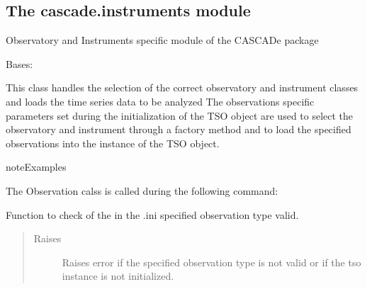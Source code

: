 \documentclass[a4paper,10pt,english]{sphinxmanual}
\begin{document}
\subsection{The cascade.instruments module}
\label{\detokenize{cascade.instruments:module-cascade.instruments.instruments}}\label{\detokenize{cascade.instruments:the-cascade-instruments-module}}\label{\detokenize{cascade.instruments::doc}}
Observatory and Instruments specific module of the CASCADe package

\begin{fulllineitems}
\label{\detokenize{cascade.instruments:cascade.instruments.instruments.Observation}}
Bases: 

This class handles the selection of the correct observatory and
instrument classes and loads the time series data to be analyzed
The observations specific parameters set during the initialization
of the TSO object are used to select the observatory and instrument
through a factory method and to load the specified observations
into the instance of the TSO object.

\begin{sphinxadmonition}{note}{Examples}

The Observation calss is  called during the following command:

%
\begin{sphinxVerbatim}[commandchars=\\\{\}]
\end{sphinxVerbatim}
\end{sphinxadmonition}

\begin{fulllineitems}
\label{\detokenize{cascade.instruments:cascade.instruments.instruments.Observation._Observation__check_observation_type}}
Function to check of the in the .ini specified observation type
valid.
\begin{quote}\begin{description}
\item[{Raises}] \leavevmode
{} \textendash{} Raises error if the specified observation type is not valid or if
the tso instance is not initialized.


\end{description}
\end{quote}
\end{fulllineitems}
\end{fulllineitems}
\end{document}
